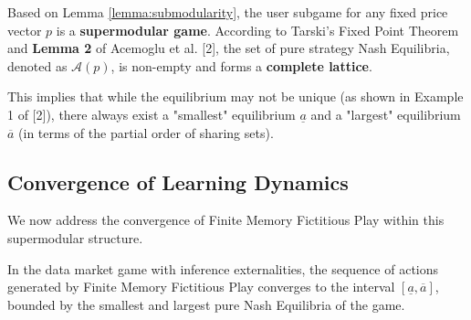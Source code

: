 \begin{theorem}
\label{thm:lattice}
Based on Lemma \ref{lemma:submodularity}, the user subgame for any fixed price vector $p$ is a \textbf{supermodular game}. According to Tarski's Fixed Point Theorem and \textbf{Lemma 2} of Acemoglu et al. [2], the set of pure strategy Nash Equilibria, denoted as $\mathcal{A}(p)$, is non-empty and forms a \textbf{complete lattice}.
\end{theorem}

This implies that while the equilibrium may not be unique (as shown in Example 1 of [2]), there always exist a "smallest" equilibrium $\underline{a}$ and a "largest" equilibrium $\overline{a}$ (in terms of the partial order of sharing sets).

\subsection{Convergence of Learning Dynamics}

We now address the convergence of Finite Memory Fictitious Play within this supermodular structure.

\begin{proposition}
In the data market game with inference externalities, the sequence of actions generated by Finite Memory Fictitious Play converges to the interval $[\underline{a}, \overline{a}]$, bounded by the smallest and largest pure Nash Equilibria of the game.
\end{proposition}

